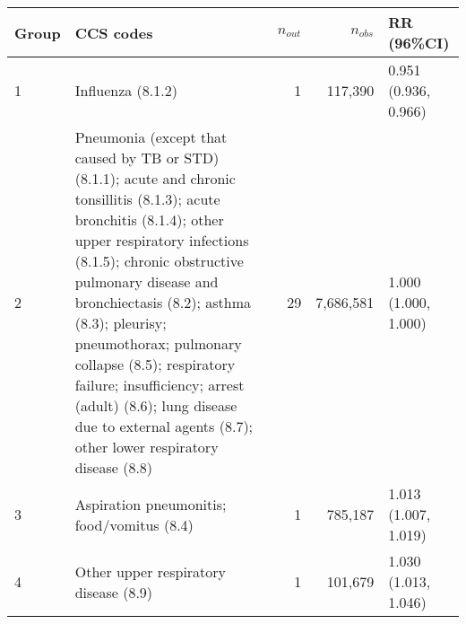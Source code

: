 \begin{tabular}{lp{6.5cm}rrp{2.2cm}}
  \hline
Group & CCS codes & $n_{out}$ & $n_{obs}$ & RR (96\%CI) \\ 
  \hline
   1 & Influenza (8.1.2) &    1 & 117,390 & 0.951 (0.936, 0.966) \\ 
     2 & Pneumonia (except that caused by TB or STD) (8.1.1); acute and chronic tonsillitis (8.1.3); acute bronchitis (8.1.4); other upper respiratory infections (8.1.5); chronic obstructive pulmonary disease and bronchiectasis (8.2); asthma (8.3); pleurisy; pneumothorax; pulmonary collapse (8.5); respiratory failure; insufficiency; arrest (adult) (8.6); lung disease due to external agents (8.7); other lower respiratory disease (8.8) &   29 & 7,686,581 & 1.000 (1.000, 1.000) \\ 
     3 & Aspiration pneumonitis; food/vomitus (8.4) &    1 & 785,187 & 1.013 (1.007, 1.019) \\ 
     4 & Other upper respiratory disease (8.9) &    1 & 101,679 & 1.030 (1.013, 1.046) \\ 
   \hline
\end{tabular}

